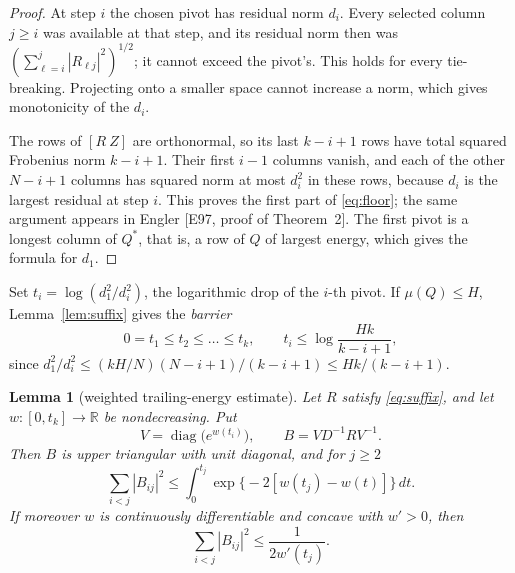 \documentclass[11pt,a4paper]{article}
\newtheorem{lemma}[theorem]{Lemma}
\theoremstyle{definition}
\numberwithin{equation}{section}
\newcommand{\R}{\mathbb R}
\begin{document}
\begin{proof}
At step $i$ the chosen pivot has residual norm $d_i$. Every selected column $j\ge i$ was available at that step, and
its residual norm then was $(\sum_{\ell=i}^j|R_{\ell j}|^2)^{1/2}$; it cannot exceed the pivot's. This holds for
every tie-breaking. Projecting onto a smaller space cannot increase a norm, which gives monotonicity of the $d_i$.

The rows of $[R\ Z]$ are orthonormal, so its last $k-i+1$ rows have total squared Frobenius norm $k-i+1$. Their first
$i-1$ columns vanish, and each of the other $N-i+1$ columns has squared norm at most $d_i^2$ in these rows, because
$d_i$ is the largest residual at step $i$. This proves the first part of \eqref{eq:floor}; the same argument appears
in Engler [E97, proof of Theorem~2]. The first pivot is a longest column of $Q^*$, that is, a row of $Q$ of largest
energy, which gives the formula for $d_1$.
\end{proof}

Set $t_i=\log(d_1^2/d_i^2)$, the logarithmic drop of the $i$-th pivot. If $\mu(Q)\le H$, Lemma~\ref{lem:suffix}
gives the \emph{barrier}
\begin{equation}\label{eq:barrier}
 0=t_1\le t_2\le\dots\le t_k,\qquad t_i\le\log\frac{Hk}{k-i+1},
\end{equation}
since $d_1^2/d_i^2\le (kH/N)(N-i+1)/(k-i+1)\le Hk/(k-i+1)$.

\begin{lemma}[weighted trailing-energy estimate]\label{lem:weighted}
Let $R$ satisfy \eqref{eq:suffix}, and let $w:[0,t_k]\to\R$ be nondecreasing. Put
\[
 V=\operatorname{diag}\bigl(e^{w(t_i)}\bigr),\qquad B=VD^{-1}RV^{-1}.
\]
Then $B$ is upper triangular with unit diagonal, and for $j\ge2$
\begin{equation}\label{eq:weighted}
 \sum_{i<j}|B_{ij}|^2\le\int_0^{t_j}\exp\bigl\{-2[w(t_j)-w(t)]\bigr\}\,dt.
\end{equation}
If moreover $w$ is continuously differentiable and concave with $w'>0$, then
\begin{equation}\label{eq:weighted-concave}
 \sum_{i<j}|B_{ij}|^2\le\frac1{2w'(t_j)}.
\end{equation}
\end{lemma}
\end{document}
